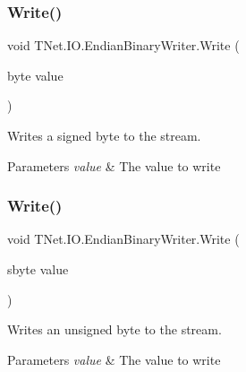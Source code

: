 \subsubsection{\texorpdfstring{Write()}{Write()}\hspace{0.1cm}{\footnotesize\ttfamily [11/17]}}
{\footnotesize\ttfamily void T\+Net.\+I\+O.\+Endian\+Binary\+Writer.\+Write (\begin{DoxyParamCaption}\item[{byte}]{value }\end{DoxyParamCaption})}



Writes a signed byte to the stream. 


\begin{DoxyParams}{Parameters}
{\em value} & The value to write\\
\hline
\end{DoxyParams}
\mbox{\label{class_t_net_1_1_i_o_1_1_endian_binary_writer_a7049eb981b6df90c439d2d628f214d00}} 
\subsubsection{\texorpdfstring{Write()}{Write()}\hspace{0.1cm}{\footnotesize\ttfamily [12/17]}}
{\footnotesize\ttfamily void T\+Net.\+I\+O.\+Endian\+Binary\+Writer.\+Write (\begin{DoxyParamCaption}\item[{sbyte}]{value }\end{DoxyParamCaption})}



Writes an unsigned byte to the stream. 


\begin{DoxyParams}{Parameters}
{\em value} & The value to write\\
\hline
\end{DoxyParams}
\mbox{\label{class_t_net_1_1_i_o_1_1_endian_binary_writer_a1553ebc4c48f14bf512eba2c225fe837}} 

